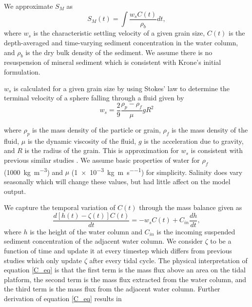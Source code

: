 \documentclass[a4paper,fleqn]{cas-sc}
\begin{document}
We approximate $S_M$ as
\begin{equation}\label{min_sed_eq}
	S_M(t) = \int{\frac{w_{s}C(t)}{\rho_b}dt},
\end{equation}
where $w_s$ is the characteristic settling velocity of a given grain size, $C(t)$ is the depth-averaged and time-varying sediment concentration in the water column, and $\rho_b$ is the dry bulk density of the sediment. We assume there is no resuspension of mineral sediment which is consistent with Krone's \citet{kroneMethodSimulatingMarsh1987} initial formulation.

$w_s$ is calculated for a given grain size by using Stokes' law to determine the terminal velocity of a sphere falling through a fluid given by
\begin{equation}\label{ws_eq}
	w_s =  \frac{2}{9}\frac{\rho_p - \rho_f}{\mu}gR^2
\end{equation}

where $\rho_p$ is the mass density of the particle or grain, $\rho_f$ is the mass density of the fluid, $\mu$ is the dynamic viscosity of the fluid, $g$ is the acceleration due to gravity, and $R$ is the radius of the grain. This is approximation for $w_s$ is consistent with previous similar studies \citet{allenSaltmarshGrowthStratification1990,temmermanModellingLongtermTidal2003,temmermanModellingEstuarineVariations2004}. We assume basic properties of water for $\rho_f$ (\SI{1000}{\kilo\gram\per\cubic\meter}) and $\mu$ (\SI{1e-3}{\kilo\gram\per\meter\per\second}) for simplicity. Salinity does vary seasonally which will change these values, but had little affect on the model output.

We capture the temporal variation of $C(t)$ through the mass balance given as
\begin{equation}\label{C_eq}
	\frac{d[h(t)-\zeta(t)]C(t)}{dt} = -w_sC(t)+C_{in}\frac{dh}{dt},
\end{equation}
where $h$ is the height of the water column and $C_{in}$ is the incoming suspended sediment concentration of the adjacent water column. We consider $\zeta$ to be a function of time and update it at every timestep which differs from previous studies \citet{kroneMethodSimulatingMarsh1987,allenSaltmarshGrowthStratification1990,frenchNumericalSimulationVertical1993,temmermanModellingLongtermTidal2003,temmermanModellingEstuarineVariations2004,frenchTidalMarshSedimentation2006} which only update $\zeta$ after every tidal cycle. The physical interpretation of equation \ref{C_eq} is that the first term is the mass flux above an area on the tidal platform, the second term is the mass flux extracted from the water column, and the third term is the mass flux from the adjacent water column. Further derivation of equation \ref{C_eq} results in
\end{document}
